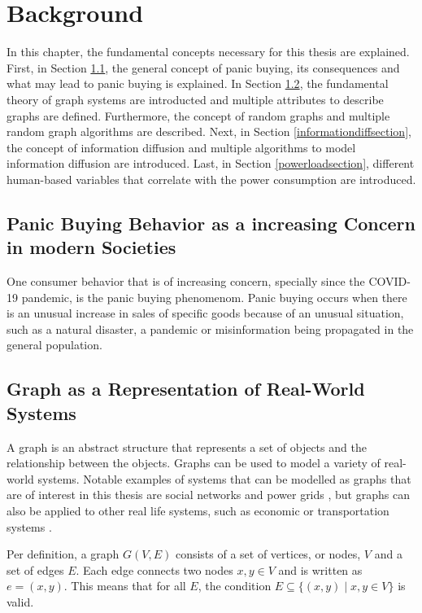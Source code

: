 \chapter{Background}
\label{background}

In this chapter, the fundamental concepts necessary for this thesis are explained.
First, in Section \ref{panicbuying}, the general concept of panic buying,
its consequences and what may lead to panic buying is explained.
In Section \ref{graphbasics}, the fundamental theory of graph systems are 
introducted and multiple attributes to describe graphs are defined.
Furthermore, the concept of random graphs and multiple random 
graph algorithms are described.
Next, in Section \ref{informationdiffsection}, the concept of information diffusion
and multiple algorithms to model information diffusion are introduced.
Last, in Section \ref{powerloadsection}, different human-based variables that 
correlate with the power consumption are introduced.


\section{Panic Buying Behavior as a increasing Concern in modern Societies}
\label{panicbuying}

One consumer behavior that is of increasing concern, specially since the 
COVID-19 pandemic, is the panic buying phenomenom.
Panic buying occurs when there is an unusual increase in sales of specific
goods because of an unusual situation, such as a natural disaster, a 
pandemic or misinformation being propagated in the general population. 



\section{Graph as a Representation of Real-World Systems}
\label{graphbasics}
A graph is an abstract structure that represents a set of objects and the relationship 
between the objects. Graphs can be used to model a variety of real-world systems.
Notable examples of systems that can be modelled as graphs that are of 
interest in this thesis are social networks 
\cite{socialgraphexample} and power grids \cite{powergraphexample}, but graphs can 
also be applied to other real life systems, such as economic 
or transportation systems \cite{economicsgraph}. %


Per definition, a graph $G(V, E)$ consists of a set of vertices, or nodes, $V$ and a 
set of edges $E$. Each edge connects two nodes $x, y \in V$ and is 
written as $e=(x, y)$. This means that for all $E$, the 
condition  $E \subseteq\{ (x, y) \mid x, y \in V  \}$ 
is valid.

